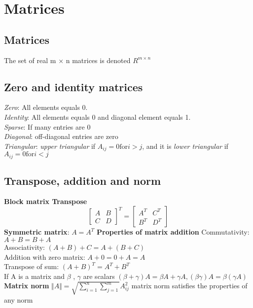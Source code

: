 \section{Matrices}
\subsection{Matrices}
The set of real m × n matrices is denoted $R^{m \times n}$
\subsection{Zero and identity matrices}
\textbullet \textit{Zero}: All elements equals 0.\\
\textbullet \textit{Identity}: All elements equals 0 and diagonal element equals 1.\\
\textbullet \textit{Sparse}: If many entries are 0\\
\textbullet \textit{Diagonal}: off-diagonal entries are zero\\
\textbullet \textit{Triangular}: \textit{upper triangular} if $A_{ij} = 0 \text{for} i>j$, and it is \textit{lower triangular} if $A_{ij} =0 \text{for} i<j$

\subsection{Transpose, addition and norm}
\textbf{Block matrix Transpose}
\[
\begin{bmatrix}
    A & B \\
    C & D
    
\end{bmatrix}^{T}= 
\begin{bmatrix}
    A^T & C^T \\
    B^T & D^T
\end{bmatrix}
\]
\textbf{Symmetric matrix}: $A = A^T$
\textbf{Properties of matrix addition}
\textbullet Commutativity: $A+B=B+A$\\
\textbullet Associativity: $(A + B) + C = A + (B + C)$\\
\textbullet Addition with zero matrix: $A+0=0+A=A$\\
\textbullet Transpose of sum:  $(A+B)^T = A^T +B^T$\\
If A is a matrix and $\beta$ , $\gamma$ are scalars
$(\beta + \gamma)A = \beta A + \gamma A, 
(\beta \gamma)A = \beta(\gamma A)
$\\
\textbf{Matrix norm}
$\Vert A \Vert = \sqrt{\sum_{i=1}^n\sum_{j=1}^m} A^2_{ij}$
matrix norm satisfies the properties of any norm

